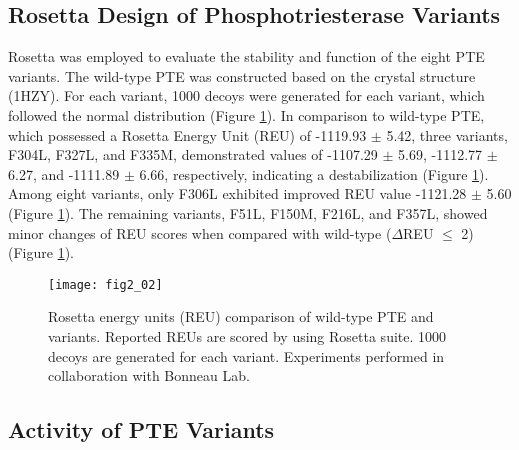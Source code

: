 \begin{refsection}
\subsection{Rosetta Design of Phosphotriesterase Variants}

Rosetta was employed to evaluate the stability and function of the eight PTE
variants. The wild-type PTE was constructed based on the crystal structure
(1HZY). For each variant, 1000 decoys were generated for each variant, which
followed the normal distribution (Figure \ref{fig:rosetta-box-plot}). In
comparison to wild-type PTE, which possessed a Rosetta Energy Unit (REU) of
-1119.93 $\pm$ 5.42, three variants, F304L, F327L, and F335M, demonstrated
values of -1107.29 $\pm$ 5.69, -1112.77 $\pm$ 6.27, and -1111.89 $\pm$ 6.66,
respectively, indicating a destabilization (Figure \ref{fig:rosetta-box-plot}).
Among eight variants, only F306L exhibited improved REU value -1121.28 $\pm$
5.60 (Figure \ref{fig:rosetta-box-plot}). The remaining variants, F51L, F150M,
F216L, and F357L, showed minor changes of REU scores when compared with
wild-type ($\Delta$REU $\leq$ 2) (Figure \ref{fig:rosetta-box-plot}).
\begin{figure}[htbp] \centering \texttt{[image: fig2\_02]}
    \caption[Rosetta energy units (REU) comparison of wild-type PTE and
    variants. Reported REUs are scored by using Rosetta suite. 1000 decoys are
generated for each variant.]{Rosetta energy units (REU) comparison of wild-type
PTE and variants. Reported REUs are scored by using Rosetta suite. 1000 decoys
are generated for each variant. Experiments performed in collaboration with
Bonneau Lab.} \label{fig:rosetta-box-plot}
\end{figure}

\subsection{Activity of PTE Variants}


\end{refsection}
